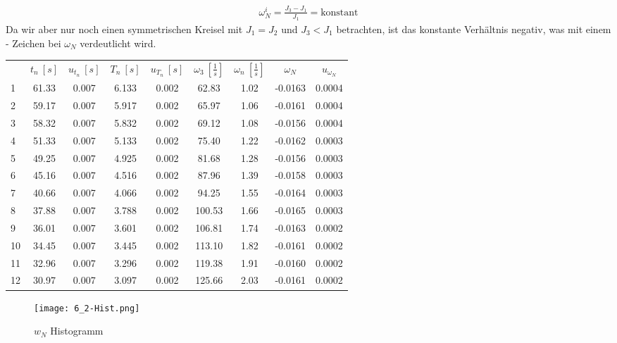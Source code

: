 \begin{align}
    \omega_N^i = \frac{J_3 - J_1}{J_1} = \text{konstant}
\end{align}
Da wir aber nur noch einen symmetrischen Kreisel mit $J_1 = J_2$ und $J_3<J_1$ betrachten, ist das konstante Verhältnis negativ, was mit einem - Zeichen bei $\omega_N$ verdeutlicht wird. 
\newpage
\begin{center}
    \begin{tabular}{gcccccccc}
         &     $t_n~[s]$ &   $u_{t_n}~[s]$ &     $T_n~[s]$ &   $u_{T_n}~[s]$ &      $\omega_3~[\frac{1}{s}]$ &    $\omega_n~[\frac{1}{s}]$ &      $\omega_N$ &    $u_{\omega_N}$ \\
        1  &  61.33 &  0.007 &  6.133 &  0.002 &   62.83 &  1.02 & -0.0163 &  0.0004 \\
        2  &  59.17 &  0.007 &  5.917 &  0.002 &   65.97 &  1.06 & -0.0161 &  0.0004 \\
        3  &  58.32 &  0.007 &  5.832 &  0.002 &   69.12 &  1.08 & -0.0156 &  0.0004 \\
        4  &  51.33 &  0.007 &  5.133 &  0.002 &   75.40 &  1.22 & -0.0162 &  0.0003 \\
        5  &  49.25 &  0.007 &  4.925 &  0.002 &   81.68 &  1.28 & -0.0156 &  0.0003 \\
        6  &  45.16 &  0.007 &  4.516 &  0.002 &   87.96 &  1.39 & -0.0158 &  0.0003 \\
        7  &  40.66 &  0.007 &  4.066 &  0.002 &   94.25 &  1.55 & -0.0164 &  0.0003 \\
        8  &  37.88 &  0.007 &  3.788 &  0.002 &  100.53 &  1.66 & -0.0165 &  0.0003 \\
        9  &  36.01 &  0.007 &  3.601 &  0.002 &  106.81 &  1.74 & -0.0163 &  0.0002 \\
        10 &  34.45 &  0.007 &  3.445 &  0.002 &  113.10 &  1.82 & -0.0161 &  0.0002 \\
        11 &  32.96 &  0.007 &  3.296 &  0.002 &  119.38 &  1.91 & -0.0160 &  0.0002 \\
        12 &  30.97 &  0.007 &  3.097 &  0.002 &  125.66 &  2.03 & -0.0161 &  0.0002 \\
    \end{tabular}
\end{center}
\begin{figure}[ht]
    \centering
    \caption{$w_N$ Histogramm}
    \texttt{[image: 6\_2-Hist.png]}
\end{figure}
